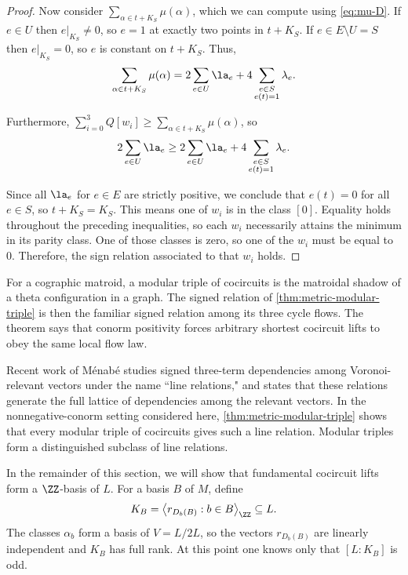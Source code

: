 \documentclass[11pt,letterpaper]{amsart}
\begin{document}
\begin{proof}
Now consider $\sum_{\alpha \in t+K_S}\mu(\alpha)$, which we can compute using \eqref{eq:mu-D}. If $e \in U$ then $e|_{K_S} \neq 0$, so $e = 1$ at exactly two points in $t+K_S$. If $e \in E\setminus U = S$ then $e|_{K_S} = 0$, so $e$ is constant on $t + K_S$. Thus,
$$\sum_{\alpha \in t+K_S}\mu(\alpha) = 2\sum_{e \in U} \la_e + 4 \sum_{\substack{e\in S\\e(t)=1}}\lambda_e.$$

Furthermore, $\sum_{i=0}^3Q[w_i] \geq \sum_{\alpha \in t+K_S} \mu(\alpha)$, so $$2\sum_{e \in U} \la_e \geq 2\sum_{e \in U} \la_e + 4 \sum_{\substack{e\in S\\e(t)=1}}\lambda_e.$$

Since all $\la_e$ for $e \in E$ are strictly positive, we conclude that $e(t) = 0$ for all $e \in S$, so $t+K_S = K_S$. This means one of $w_i$ is in the class $[0]$. Equality holds throughout the preceding inequalities, so each $w_i$ necessarily attains the minimum in its parity class. One of those classes is zero, so one of the $w_i$ must be equal to $0$. Therefore, the sign relation associated to that $w_i$ holds.
\end{proof}

\begin{remark}
For a cographic matroid, a modular triple of cocircuits is the matroidal shadow of a theta configuration in a graph.  The signed relation of \cref{thm:metric-modular-triple} is then the familiar signed relation among its three cycle flows.  The theorem says that conorm positivity forces arbitrary shortest cocircuit lifts to obey the same local flow law.
\end{remark}

Recent work of M\'enab\'e \cite{menabe} studies signed three-term dependencies among Voronoi-relevant vectors under the name ``line relations," and states that these relations generate the full lattice of dependencies among the relevant vectors. In the nonnegative-conorm setting considered here, \cref{thm:metric-modular-triple} shows that every modular triple of cocircuits gives such a line relation. Modular triples form a distinguished subclass of line relations.

In the remainder of this section, we will show that fundamental cocircuit lifts form a $\ZZ$-basis of $L$. For a basis $B$ of $M$, define
\begin{equation*}
  K_B=\left\langle r_{D_b(B)}:b\in B\right\rangle_{\ZZ}\subseteq L.
\end{equation*}
The classes $\alpha_b$ form a basis of $V=L/2L$, so the vectors $r_{D_b(B)}$ are linearly independent and $K_B$ has full rank.  At this point one knows only that $[L:K_B]$ is odd.
\end{document}

